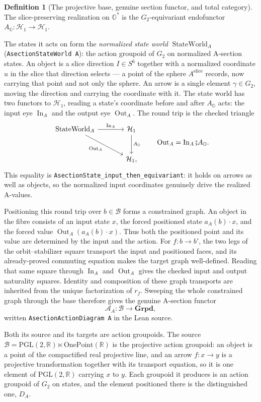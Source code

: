 \documentclass[11pt]{article}
\newcommand{\OO}{\mathbb{O}}
\newcommand{\RR}{\mathbb{R}}
\newcommand{\Ostar}{\OO^{*}}
\theoremstyle{plain}
\theoremstyle{definition}
\newtheorem{definition}[theorem]{Definition}
\theoremstyle{remark}
\begin{document}
\begin{definition}[The projective base, genuine section functor, and total category]
The slice-preserving realization on $\Ostar$ is the $G_2$-equivariant endofunctor
$A_{\OO}:\mathcal H_1\to\mathcal H_1$.

The states it acts on form the \emph{normalized state world}
$\operatorname{StateWorld}_A$ \textup{(}\texttt{AsectionStateWorld\,A}\textup{)}:
the action groupoid of $G_2$ on normalized A-section states. An object is a
slice direction $I\in S^6$ together with a normalized coordinate $u$ in the
slice that direction selects --- a point of the sphere $A^{\mathrm{slice}}$
records, now carrying that point and not only the sphere. An arrow is a single
element $\gamma\in G_2$, moving the direction and carrying the coordinate with
it. The state world has two functors to $\mathcal H_1$, reading a state's
coordinate before and after $A_{\OO}$ acts: the input eye
$\operatorname{In}_A$ and the output eye $\operatorname{Out}_A$.
The round trip is the checked triangle
\[
\begin{tikzcd}[column sep=large,row sep=large]
\operatorname{StateWorld}_A
  \arrow[r,"\operatorname{In}_A"]
  \arrow[dr,"\operatorname{Out}_A"'] &
\mathcal H_1 \arrow[d,"A_{\OO}"]\\
& \mathcal H_1,
\end{tikzcd}
\qquad
\operatorname{Out}_A=\operatorname{In}_A\fatsemi A_{\OO}.
\]
This equality is
\texttt{AsectionState\_input\_then\_equivariant}: it holds on arrows as well as objects, so
the normalized input coordinates genuinely drive the realized A-values.

Positioning this round trip over $b\in\mathcal B$ forms a constrained graph. An object in the
fibre consists of an input state $x$, the forced positioned state
$a_A(b)\cdot x$, and the forced value
$\operatorname{Out}_A(a_A(b)\cdot x)$. Thus both the positioned point and its value are determined
by the input and the action. For $f:b\to b'$, the two legs of the orbit--stabilizer square transport the input
and positioned faces, and its already-proved commuting equation makes the target graph
well-defined. Reading that same square through $\operatorname{In}_A$ and
$\operatorname{Out}_A$ gives the checked input and output naturality squares. Identity and
composition of these graph transports are inherited from the unique factorization of $r_f$.
Sweeping the whole constrained graph through the base therefore gives the genuine A-section
functor
\[
  \mathcal A_A:\mathcal B\longrightarrow\mathbf{Grpd},
\]
written \texttt{AsectionActionDiagram\,A} in the Lean source.

Both its source and its targets are action groupoids. The source
$\mathcal B=\mathrm{PGL}(2,\RR)\ltimes\mathrm{OnePoint}(\RR)$ is the projective
action groupoid: an object is a point of the compactified real projective line,
and an arrow $f:x\to y$ is a projective transformation together with its
transport equation, so it is one element of $\mathrm{PGL}(2,\RR)$ carrying $x$
to $y$. Each groupoid it produces is an action groupoid of $G_2$ on states, and
the element positioned there is the distinguished one, $D_A$.


\end{definition}
\end{document}
